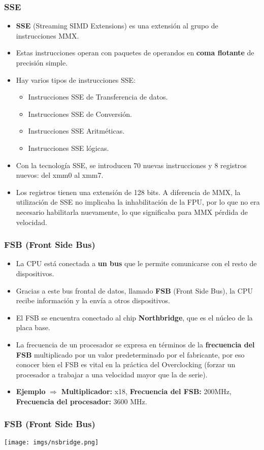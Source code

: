 \frame
{
\frametitle{SSE}
\begin{itemize}
 \item \textbf{SSE} (Streaming SIMD Extensions) es una extensión al grupo de instrucciones MMX.
 \item Estas instrucciones operan con paquetes de operandos en \textbf{coma flotante} de precisión simple.
 \item Hay varios tipos de instrucciones SSE:
	\begin{itemize}
		\item Instrucciones SSE de Transferencia de datos.
 		\item Instrucciones SSE de Conversión.
 		\item Instrucciones SSE Aritméticas.
 		\item Instrucciones SSE lógicas.
	\end{itemize}
 \item Con la tecnología SSE, se introducen 70 nuevas instrucciones y 8 registros nuevos: del xmm0 al xmm7.
 \item Los registros tienen una extensión de 128 bits. A diferencia de MMX, la utilización de SSE no implicaba la inhabilitación de la FPU, por lo que no era necesario habilitarla nuevamente, lo que significaba para MMX pérdida de velocidad.
\end{itemize}
}

\frame
{
\frametitle{FSB (Front Side Bus)}
\begin{itemize}
 \item La CPU está conectada a \textbf{un bus} que le permite comunicarse con el resto de dispositivos.
 \item Gracias a este bus frontal de datos, llamado \textbf{FSB} (Front Side Bus), la CPU recibe información y la envía a otros dispositivos.
 \item El FSB se encuentra conectado al chip \textbf{Northbridge}, que es el núcleo de la placa base.
 \item La frecuencia de un procesador se expresa en términos de la \textbf{frecuencia del FSB} multiplicado por un valor predeterminado por el fabricante, por eso conocer bien el FSB es vital en la práctica del Overclocking (forzar un procesador a trabajar a una velocidad mayor que la de serie).
 \item \textbf{Ejemplo} $\Rightarrow$ \textbf{Multiplicador:} x18, \textbf{Frecuencia del FSB:} 200MHz, \textbf{Frecuencia del procesador:} 3600 MHz.
\end{itemize}
}

\frame
{
\frametitle{FSB (Front Side Bus)}
\begin{center}
\texttt{[image: imgs/nsbridge.png]}
\end{center}
}
